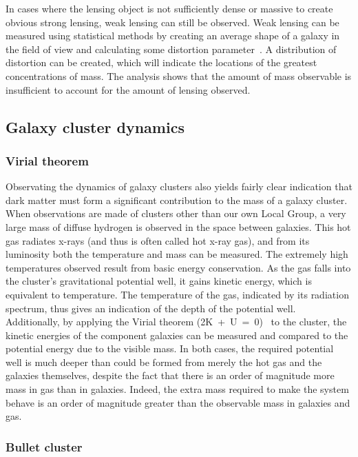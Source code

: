 In cases where the lensing object is not sufficiently dense or massive to create obvious strong lensing, weak lensing can still be observed. Weak lensing can be measured using statistical methods by creating an average shape of a galaxy in the field of view and calculating some distortion parameter~\cite{Bartelmann:1999yn}. A distribution of distortion can be created, which will indicate the locations of the greatest concentrations of mass. The analysis shows that the amount of mass observable is insufficient to account for the amount of lensing observed.

\subsection{Galaxy cluster dynamics}

\subsubsection{Virial theorem}

Observating the dynamics of galaxy clusters also yields fairly clear indication that dark matter must form a significant contribution to the mass of a galaxy cluster. When observations are made of clusters other than our own Local Group, a very large mass of diffuse hydrogen is observed in the space between galaxies. This hot gas radiates x-rays (and thus is often called hot x-ray gas), and from its luminosity both the temperature and mass can be measured. The extremely high temperatures observed result from basic energy conservation. As the gas falls into the cluster's gravitational potential well, it gains kinetic energy, which is equivalent to temperature. The temperature of the gas, indicated by its radiation spectrum, thus gives an indication of the depth of the potential well. Additionally, by applying the Virial theorem (2K~+~U~=~0)~\cite{Claussius:1870} to the cluster, the kinetic energies of the component galaxies can be measured and compared to the potential energy due to the visible mass. In both cases, the required potential well is much deeper than could be formed from merely the hot gas and the galaxies themselves, despite the fact that there is an order of magnitude more mass in gas than in galaxies. Indeed, the extra mass required to make the system behave is an order of magnitude greater than the observable mass in galaxies and gas.

\subsubsection{Bullet cluster}

